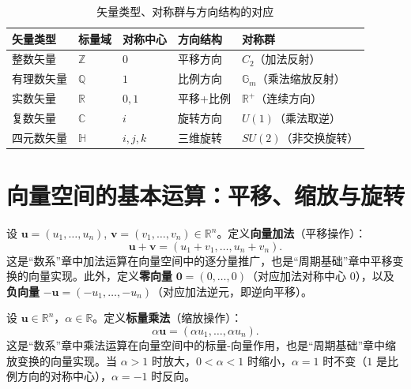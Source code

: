 \begin{table}[htbp]
    \centering
    \caption{矢量类型、对称群与方向结构的对应}
    \label{tab:vector_types}
    \begin{tabular}{>{\centering\arraybackslash}p{2.2cm}>{\centering\arraybackslash}p{2cm}>{\centering\arraybackslash}p{2.5cm}>{\centering\arraybackslash}p{3cm}>{\centering\arraybackslash}p{2.5cm}}
        \toprule
        矢量类型 & 标量域 & 对称中心 & 方向结构 & 对称群 \\
        \midrule
        整数矢量 & $\mathbb{Z}$ & $0$ & 平移方向 & $C_2$（加法反射） \\
        有理数矢量 & $\mathbb{Q}$ & $1$ & 比例方向 & $\mathbb{G}_m$（乘法缩放反射） \\
        实数矢量 & $\mathbb{R}$ & $0,1$ & 平移+比例 & $\mathbb{R}^+$（连续方向） \\
        复数矢量 & $\mathbb{C}$ & $i$ & 旋转方向 & $U(1)$（乘法取逆） \\
        四元数矢量 & $\mathbb{H}$ & $i,j,k$ & 三维旋转 & $SU(2)$（非交换旋转） \\
        \bottomrule
    \end{tabular}
\end{table}
\section{\texorpdfstring{向量空间的基本运算：平移、缩放与旋转}{向量空间的基本运算：平移、缩放与旋转}}

\begin{definition}[向量加法——平移]\label{def:vector_addition_translation}
设 $\mathbf{u} = (u_1,\dots,u_n)$, $\mathbf{v} = (v_1,\dots,v_n) \in \mathbb{R}^n$。定义\textbf{向量加法}（平移操作）：
\[\mathbf{u} + \mathbf{v} = (u_1+v_1, \dots, u_n+v_n).\]
这是“数系”章中加法运算在向量空间中的逐分量推广，也是“周期基础”章中平移变换的向量实现。此外，定义\textbf{零向量} $\mathbf{0} = (0,\dots,0)$（对应加法对称中心 $0$），以及\textbf{负向量} $-\mathbf{u} = (-u_1,\dots,-u_n)$（对应加法逆元，即逆向平移）。
\end{definition}

\begin{definition}[标量乘法——缩放]\label{def:scalar_multiplication_scaling}
设 $\mathbf{u} \in \mathbb{R}^n$，$\alpha \in \mathbb{R}$。定义\textbf{标量乘法}（缩放操作）：
\[\alpha \mathbf{u} = (\alpha u_1, \dots, \alpha u_n).\]
这是“数系”章中乘法运算在向量空间中的标量-向量作用，也是“周期基础”章中缩放变换的向量实现。当 $\alpha > 1$ 时放大，$0 < \alpha < 1$ 时缩小，$\alpha = 1$ 时不变（$1$ 是比例方向的对称中心），$\alpha = -1$ 时反向。
\end{definition}

